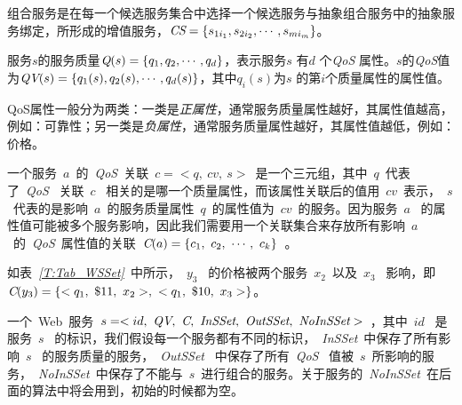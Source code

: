 \begin{definition}[组合服务]

组合服务是在每一个候选服务集合中选择一个候选服务与抽象组合服务中的抽象服务绑定，所形成的增值服务，$\emph{CS}=\{s_{1i_{1}}, s_{2i_{2}}, \cdots, s_{mi_{m}}\}$。

\end{definition}


\begin{definition}[服务质量]

服务$s$的服务质量$\emph{Q}(s)=\{q_{1}, q_{2}, \cdots, q_{d}\}$，表示服务$s$ 有$d$ 个\emph{QoS} 属性。$s$的\emph{QoS}值为$\emph{QV}(s)=\{q_{1}(s), q_{2}(s), \cdots, q_{d}(s)\}$，其中$q_{i}(s)$为$s$ 的第$i$个质量属性的属性值。

\end{definition}

QoS属性一般分为两类：一类是\emph{正属性}，通常服务质量属性越好，其属性值越高，例如：可靠性；另一类是\emph{负属性}，通常服务质量属性越好，其属性值越低，例如：价格。


\begin{definition}[QoS关联]

一个服务~$a$~的~\emph{QoS}~关联~$c=<q,\ cv,\ s>$~是一个三元组，其中~$q$~代表了~\emph{QoS}~ 关联~$c$~ 相关的是哪一个质量属性，而该属性关联后的值用~$cv$~表示，~$s$~代表的是影响~$a$~的服务质量属性~$q$~的属性值为~$cv$~的服务。因为服务~$a$~ 的属性值可能被多个服务影响，因此我们需要用一个关联集合来存放所有影响~$a$ ~的~\emph{QoS}~属性值的关联~$\emph{C}(a)=\{c_{1},\ c_{2},\ \cdots,\ c_{k}\}$~。

\end{definition}

\begin{example}[QoS关联]

如表\emph{~\ref{T:Tab_WSSet}~}中所示，~$y_{3}$~ 的价格被两个服务~$x_{2}$~以及~$x_{3}$~ 影响，即~$\emph{C}(y_{3})=\{<q_{1},\ \$11,\ x_{2}>,\ <q_{1},\ \$10,\ x_{3}>\}$。

\end{example}

\begin{definition}[Web服务]

一个~Web~服务~$s=<id,\ \emph{QV},\ \emph{C},\ \emph{InSSet},\ \emph{OutSSet},\ \emph{NoInSSet}>$~，其中~$id$~ 是服务~$s$~ 的标识，我们假设每一个服务都有不同的标识，~\emph{InSSet}~中保存了所有影响~$s$~ 的服务质量的服务，~\emph{OutSSet}~ 中保存了所有~\emph{QoS}~ 值被~$s$~所影响的服务，~\emph{NoInSSet}~中保存了不能与~$s$~进行组合的服务。关于服务的~\emph{NoInSSet}~在后面的算法中将会用到，初始的时候都为空。

\end{definition}

